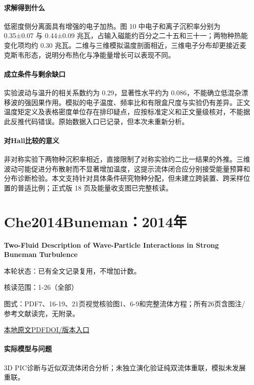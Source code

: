 \paragraph{求解得到什么}低密度侧分离面具有增强的电子加热。图 10 中电子和离子沉积率分别为 0.35±0.07 与 0.44±0.09 兆瓦，占输入磁能约百分之二十五和三十一；两物种热能变化项均约 0.30 兆瓦。二维与三维模拟温度剖面相近，三维电子分布却更接近麦克斯韦形态，说明分布热化与净能量增长可以表现不同。

\paragraph{成立条件与剩余缺口}实验波动与温升的相关系数约为 0.29，显著性水平约为 0.086，不能确立低混杂漂移波的强因果作用。模拟的电子温度、频率比和有限盒尺度与实验仍有差异。正文温度矩定义及表格密度单位存在排印疑点，应按标准定义和正文量级核对，不能据此反推代码错误。原始数据入口已记录，但本次未重新分析。

\paragraph{对Hall比较的意义}非对称实验下两物种沉积率相近，直接限制了对称实验约二比一结果的外推。三维波动可能促进分布散射而不显著增加温度，这提示流体闭合应分别接受能量预算和分布诊断检验。本文支持针对具体条件研究物种分配，但未建立跨装置、跨采样位置的普适比例；正式版 18 页及能量收支图已完整核读。

\section{Che2014Buneman：2014年}\label{paper:Che2014Buneman}

\textbf{Two-Fluid Description of Wave-Particle Interactions in Strong Buneman Turbulence}\citep{Che2014Buneman}

\textsf{本轮状态：}已有全文记录复用，不增加计数。

\textsf{核读范围：}1-26（全部）\par\textsf{图式：}PDF7、16-19、21页视觉核验图1、6-9和完整流体方程；所有26页含图注/参考文献读完，无附录。

\href{run:../../papers/Che2014Buneman.pdf}{本地原文PDF}\quad\href{https://doi.org/10.1063/1.4882677}{DOI/版本入口}

\paragraph{实际模型与问题}3D PIC诊断与近似双流体闭合分析；未独立演化验证纯双流体重联，模拟未发展重联。

